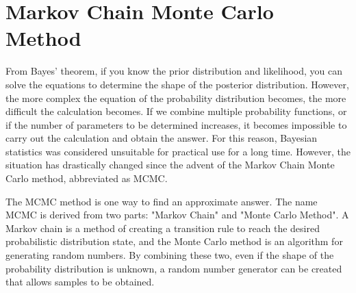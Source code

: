 \documentclass{ltjsbook}
\begin{document}
\section{Markov Chain Monte Carlo Method}
\label{MCMC}
From Bayes' theorem, if you know the prior distribution and likelihood, you can solve the equations to determine the shape of the posterior distribution. However, the more complex the equation of the probability distribution becomes, the more difficult the calculation becomes. If we combine multiple probability functions, or if the number of parameters to be determined increases, it becomes impossible to carry out the calculation and obtain the answer. For this reason, Bayesian statistics was considered unsuitable for practical use for a long time. However, the situation has drastically changed since the advent of the Markov Chain Monte Carlo method, abbreviated as MCMC.

The MCMC method is one way to find an approximate answer. The name MCMC is derived from two parts: "Markov Chain" and "Monte Carlo Method". A Markov chain is a method of creating a transition rule to reach the desired probabilistic distribution state, and the Monte Carlo method is an algorithm for generating random numbers. By combining these two, even if the shape of the probability distribution is unknown, a random number generator can be created that allows samples to be obtained.
\end{document}
